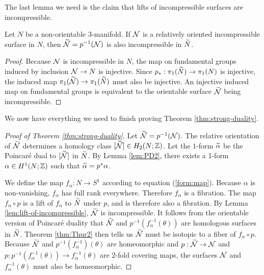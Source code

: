 The last lemma we need is the claim that lifts of incompressible surfaces are incompressible.
\begin{lem}
  \label{lem:lift-of-incompressible}
  Let $N$ be a non-orientable 3-manifold.  If $\mathcal{N}$ is a relatively oriented incompressible surface in $N$, then $\widetilde{\mathcal{N}}=p^{-1}(\mathcal{N})$ is also incompressible in $\widetilde{N}$.
\end{lem}
\begin{proof}
  Because $\mathcal{N}$ is incompressible in $N$, the map on fundamental groups induced by inclusion $\mathcal{N}\rightarrow N$ is injective.
Since $p_\ast:\pi_1(\widetilde{N})\rightarrow\pi_1(N)$ is injective, the induced map $\pi_1(\widetilde{\mathcal{N}}) \to \pi_1(\widetilde{N})$ must also be injective.  An injective induced map on fundamental groups is equivalent to the orientable surface $\widetilde{\mathcal{N}}$ being incompressible.
\end{proof}


We now have everything we need to finish proving Theorem \ref{thm:strong-duality}.
\begin{proof}[Proof of Theorem \ref{thm:strong-duality}]
  Let $\widetilde{\mathcal{N}}=p^{-1}(\mathcal{N}).$
  The relative orientation of $\widetilde{\mathcal{N}}$ determines a homology class $[\widetilde{\mathcal{N}}]\in H_2(N;\mathbb{Z})$.  Let the $1$-form $\widetilde{\alpha}$ be the Poincar\'e dual to $[\widetilde{\mathcal{N}}]$ in $\widetilde{N}$.
  By Lemma \ref{lem:PD2}, there exists a 1-form $\alpha\in H^1(N;\mathbb{Z})$ such that $\widetilde{\alpha}=p^\ast\alpha$.  %

We define the map $f_\alpha:N\rightarrow S^1$ according to equation (\ref{form:map}).  Because $\alpha$ is non-vanishing, $f_{\alpha}$ has full rank everywhere.  Therefore $f_\alpha$ is a fibration.
The map $f_{\alpha} \circ p$ is a lift of $f_{\alpha}$ to $\widetilde{N}$ under $p$, and is therefore also a fibration.
  By Lemma \ref{lem:lift-of-incompressible}, $\widetilde{\mathcal{N}}$ is incompressible.
It follows from the orientable version of Poincar\'e duality that $\widetilde{\mathcal{N}}$ and $p^{-1}(f_{\alpha}^{-1}(\theta))$ are homologous surfaces in $\widetilde{N}$.    Theorem \ref{thm:Thur2} then tells us $\widetilde{\mathcal{N}}$ must be isotopic to a fiber of $f_{\alpha} \circ p$.
  Because $\widetilde{\mathcal{N}}$ and $p^{-1}(f_{\alpha}^{-1})(\theta)$ are homeomorphic and $p:\widetilde{\mathcal{N}}\rightarrow \mathcal{N}$ and $p:p^{-1}(f^{-1}_{\alpha}(\theta))\rightarrow f^{-1}_\alpha(\theta)$ are 2-fold covering maps, the surfaces $\mathcal{N}$ and $f_{\alpha}^{-1}(\theta)$ must also be homeomorphic.
\end{proof}

